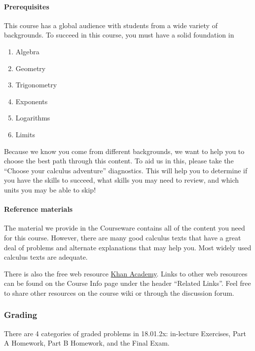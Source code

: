 \documentclass[pdftex, brazil, 12pt, twoside]{article}
\begin{document}
\paragraph{Prerequisites}
This course has a global audience with students from a wide variety of backgrounds.
To succeed in this course, you must have a solid foundation in

\begin{enumerate}[noitemsep]
\item Algebra
\item Geometry
\item Trigonometry
\item Exponents
\item Logarithms
\item Limits
\end{enumerate}

Because we know you come from different backgrounds, we want to help you to choose
the best path through this content. To aid us in this, please take the
``Choose your calculus adventure'' diagnostics. This will help you to determine
if you have the skills to succeed, what skills you may need to review, and which
units you may be able to skip!

\paragraph{Reference materials}
The material we provide in the Courseware contains all of the content you need for
this course. However, there are many good calculus texts that have a great deal of
problems and alternate explanations that may help you. Most widely used calculus
texts are adequate.

There is also the free web resource \href{https://www.khanacademy.org/}{Khan Academy}.
Links to other web resources can be found on the Course Info page under the header
``Related Links''. Feel free to share other resources on the course wiki or through
the discussion forum.

\subsubsection{Grading}
\label{gs-ol-grading}

There are 4 categories of graded problems in 18.01.2x: in-lecture Exercises,
Part A Homework, Part B Homework, and the Final Exam.
\end{document}
